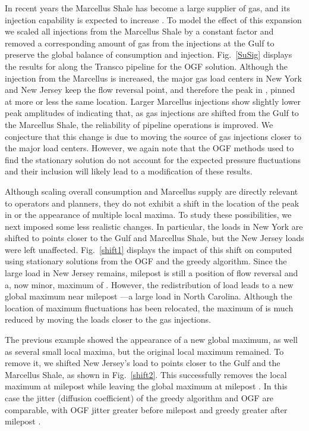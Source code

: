 \documentclass[10pt, conference, compsocconf]{IEEEtran}
\begin{document}
In recent years the Marcellus Shale has become a large supplier of
gas, and its injection capability is expected to increase \cite{NERC2013-gas-grid}.
To model the effect of this expansion we scaled all injections from the
Marcellus Shale by a constant factor and removed a corresponding amount of
gas from the injections at the Gulf to preserve the global balance
of consumption and injection.  Fig.~\ref{SuSig} displays the results for  along the Transco pipeline for the OGF solution. Although the injection from the Marcellus is increased, the major gas load centers in New York and New Jersey keep the flow reversal point, and therefore the peak in , pinned at more or less the same location. Larger Marcellus injections show slightly lower peak amplitudes of  indicating that, as gas injections are shifted from the Gulf to the
Marcellus Shale, the reliability of pipeline operations is improved. We conjecture that this change is due to moving the source of gas injections closer to the major load centers.  However, we again note that the OGF methods used to find the stationary solution do not account for the expected pressure fluctuations and their inclusion will likely lead to a modification of these results.

Although scaling overall consumption and Marcellus supply are directly relevant to operators and planners, they do not exhibit a shift in the location of the peak in  or the appearance of multiple local maxima. To study these possibilities, we next imposed some less realistic changes.
In particular, the loads in New York are shifted to points closer to the Gulf and Marcellus Shale, but the New Jersey loads were left unaffected.  Fig.~\ref{shift1} displays the impact of this shift on  computed using stationary solutions from the OGF and the greedy algorithm.
Since the large load in New Jersey remains, milepost  is still a position
of flow reversal and a, now minor, maximum of . However, the redistribution of load leads to a new global maximum near milepost ---a large load in North Carolina.  Although the location of maximum fluctuations has been relocated, the maximum of  is much reduced by moving the loads closer to the gas injections.

The previous example showed the appearance of a new global maximum, as well as several small local maxima, but the original local maximum remained.  To remove it, we shifted New Jersey's load to points closer to the Gulf and the Marcellus Shale, as shown in Fig.~\ref{shift2}.
This successfully removes the local maximum at milepost  while leaving the global maximum at milepost . In this case the jitter (diffusion coefficient) of the greedy algorithm and OGF
are comparable, with OGF jitter greater before milepost  and greedy greater after milepost .
\end{document}

